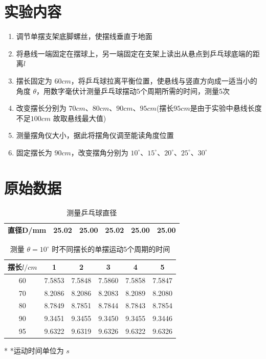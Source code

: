 \documentclass[UTF8]{ctexart}
\title{}
\author{}
\date{}
\begin{document}
\begin{titlepage}		
		
\end{titlepage}

\section{实验内容}
\begin{enumerate}
    \item 调节单摆支架底脚螺丝，使摆线垂直于地面
    \item 将悬线一端固定在摆球上，另一端固定在支架上读出从悬点到乒乓球底端的距离$l$ 
    \item 摆长固定为 $60cm$，将乒乓球拉离平衡位置，使悬线与竖直方向成一适当小的角度 $\theta$，用数字毫伏计测量乒乓球摆动5个周期所需的时间，测量5次
    \item 改变摆长分别为 $70cm$、$80cm$、$90cm$、$95cm$(摆长$95cm$是由于实验中悬线长度不足$100cm$ 故取悬线最大值)
    \item 测量摆角仪大小，据此将摆角仪调至能读角度位置
    \item 固定摆长为 $90cm$，改变摆角分别为 $10^{\circ}$、$15^{\circ}$、$20^{\circ}$、$25^{\circ}$、$30^{\circ}$ 

\end{enumerate}
\section{原始数据}


\begin{table}[H]
\centering
\caption{测量乒乓球直径}
\begin{tabular}{|c|c|c|c|c|c|}
\toprule[1pt]
直径D/mm & 25.02 & 25.00 & 25.02 & 25.00 & 25.00 \\
\bottomrule[1pt]
\end{tabular}
\end{table}

\begin{table}[H]
\centering
\caption{测量 $ \theta = 10^{\circ}$ 时不同摆长的单摆运动5个周期的时间}
\begin{tabular}{|c|c|c|c|c|c|}
\toprule[1pt]
\midrule
摆长$l/cm$ & 1 & 2 & 3 & 4 & 5 \\
\midrule
60 & 7.5853 & 7.5848 & 7.5860 & 7.5858 & 7.5847 \\
\midrule
70 & 8.2086 & 8.2086 & 8.2083 & 8.2089 & 8.2080 \\
\midrule
80 & 8.7849 & 8.7851 & 8.7844 & 8.7843 & 8.7854 \\
\midrule
90 & 9.3451 & 9.3455 & 9.3450 & 9.3455 & 9.3446 \\
\midrule
95 & 9.6322 & 9.6319 & 9.6326 & 9.6322 & 9.6326 \\
\midrule
\bottomrule[1pt]
\end{tabular}
\begin{tablenotes}
\centering
    \footnotesize
    \item[*] *运动时间单位为 $s$
\end{tablenotes}

\end{table}
\end{document}
